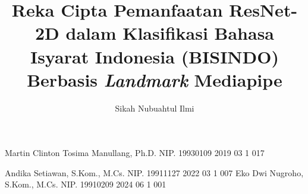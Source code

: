 \documentclass[article]{report} %
\begin{document}

    
    \title{Reka Cipta Pemanfaatan ResNet-2D dalam Klasifikasi Bahasa Isyarat Indonesia (BISINDO) Berbasis \textit{Landmark} Mediapipe} %
    
    \author{Sikah Nubuahtul Ilmi}		%
	
    \dosbingA%
        {Martin Clinton Tosima Manullang, Ph.D.}%
        {NIP. 19930109 2019 03 1 017}				%
        
    \pengujiA%
        {Andika Setiawan, S.Kom., M.Cs.}%
        {NIP. 19911127 2022 03 1 007}				%
    \pengujiB%
        {Eko Dwi Nugroho, S.Kom., M.Cs.}%
        {NIP. 19910209 2024 06 1 001}				%

    \sloppy %
    \setcounter{page}{1} %
\end{document}
